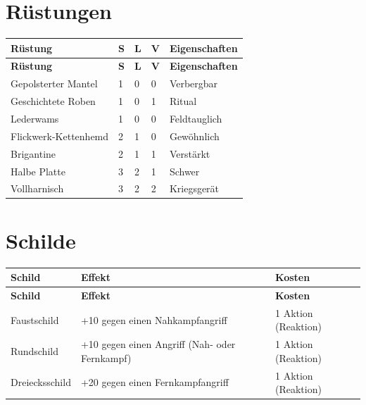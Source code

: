 \section{Rüstungen}
\begin{longtable}{p{}p{}p{}p{}p{}}
    \toprule
    \textbf{Rüstung} & \textbf{S} & \textbf{L} & \textbf{V} & \textbf{Eigenschaften} \\
    \midrule
    \endfirsthead
    \toprule
    \textbf{Rüstung} & \textbf{S} & \textbf{L} & \textbf{V} & \textbf{Eigenschaften} \\
    \midrule
    \endhead

    Gepolsterter Mantel & 1 & 0 & 0 & Verbergbar \\
    Geschichtete Roben  & 1 & 0 & 1 & Ritual \\
    Lederwams           & 1 & 0 & 0 & Feldtauglich \\
    Flickwerk-Kettenhemd & 2 & 1 & 0 & Gewöhnlich \\
    Brigantine          & 2 & 1 & 1 & Verstärkt \\
    Halbe Platte        & 3 & 2 & 1 & Schwer \\
    Vollharnisch        & 3 & 2 & 2 & Kriegsgerät \\

    \bottomrule
\end{longtable}


\section{Schilde}
\begin{longtable}{p{}p{}p{}}
    \toprule
    \textbf{Schild} & \textbf{Effekt} & \textbf{Kosten} \\
    \midrule
    \endfirsthead
    \toprule
    \textbf{Schild} & \textbf{Effekt} & \textbf{Kosten} \\
    \midrule
    \endhead

    Faustschild & +10 gegen einen Nahkampfangriff & 1 Aktion (Reaktion) \\
    Rundschild & +10 gegen einen Angriff (Nah- oder Fernkampf) & 1 Aktion (Reaktion) \\
    Dreiecksschild & +20 gegen einen Fernkampfangriff & 1 Aktion (Reaktion) \\

    \bottomrule
\end{longtable}
